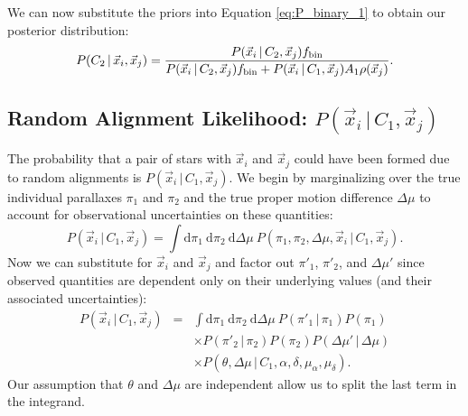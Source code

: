 \documentclass[usenatbib]{mnras}
\newcommand{\given}{\,|\,}
\newcommand{\dd}{\mathrm{d}}
\begin{document}
We can now substitute the priors into Equation \ref{eq:P_binary_1} to obtain our posterior distribution:
\begin{equation}
P(C_2 \given \vec{x}_i, \vec{x}_j) = \frac{P(\vec{x}_i \given C_2, \vec{x}_j) f_{\rm bin} }{P(\vec{x}_i \given C_2, \vec{x}_j) f_{\rm bin}  + P(\vec{x}_i \given C_1, \vec{x}_j) A_1 \rho(\vec{x}_j)  }. \label{eq:P_binary_2}
\end{equation}




\subsection{Random Alignment Likelihood: $P(\vec{x}_i \given C_1, \vec{x}_j)$}
\label{sec:random}

The probability that a pair of stars with $\vec{x}_i$ and $\vec{x}_j$ could have been formed due to random alignments is $P(\vec{x}_i \given C_1, \vec{x}_j)$. We begin by marginalizing over the true individual parallaxes $\pi_1$ and $\pi_2$ and the true proper motion difference $\Delta \mu$ to account for observational uncertainties on these quantities:
\begin{equation}
P(\vec{x}_i \given C_1, \vec{x}_j) = \int \dd \pi_1\ \dd \pi_2\ \dd \Delta \mu\ P(\pi_1, \pi_2, \Delta \mu, \vec{x}_i \given C_1, \vec{x}_j). \label{eq:P_noise_marginalized}
\end{equation}
Now we can substitute for $\vec{x}_i$ and $\vec{x}_j$ and factor out $\pi'_1$, $\pi'_2$, and $\Delta \mu'$ since observed quantities are dependent only on their underlying values (and their associated uncertainties):
\begin{eqnarray}
P(\vec{x}_i \given C_1, \vec{x}_j) &=& \int  \dd \pi_1\ \dd \pi_2\ \dd \Delta \mu\ P(\pi'_1 \given \pi_1) P(\pi_1) \nonumber \\
	& &  \times P(\pi'_2 \given \pi_2) P(\pi_2) P(\Delta \mu' \given \Delta \mu) \nonumber \\
	& &  \times  P(\theta, \Delta \mu \given C_1, \alpha, \delta, \mu_{\alpha}, \mu_{\delta}). \label{eq:RA_substituted}
\end{eqnarray}
Our assumption that $\theta$ and $\Delta \mu$ are independent allow us to split the last term in the integrand. 
\end{document}
